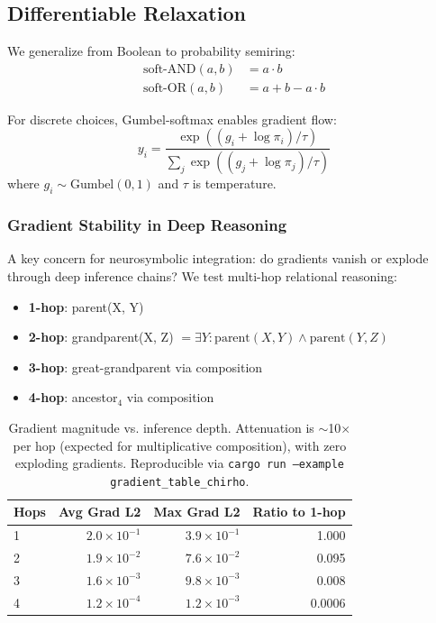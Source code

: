 \documentclass[11pt,a4paper]{article}
\begin{document}
\subsection{Differentiable Relaxation}

We generalize from Boolean to probability semiring:
\begin{align}
  \text{soft-AND}(a, b) &= a \cdot b \\
  \text{soft-OR}(a, b) &= a + b - a \cdot b
\end{align}

For discrete choices, Gumbel-softmax \cite{gumbel_softmax_chirho} enables gradient flow:
\[
y_i = \frac{\exp((g_i + \log \pi_i) / \tau)}{\sum_j \exp((g_j + \log \pi_j) / \tau)}
\]
where $g_i \sim \text{Gumbel}(0, 1)$ and $\tau$ is temperature.

\subsubsection{Gradient Stability in Deep Reasoning}

A key concern for neurosymbolic integration: do gradients vanish or explode through deep inference chains? We test multi-hop relational reasoning:
\begin{itemize}
  \item \textbf{1-hop}: parent(X, Y)
  \item \textbf{2-hop}: grandparent(X, Z) $= \exists Y: \text{parent}(X, Y) \wedge \text{parent}(Y, Z)$
  \item \textbf{3-hop}: great-grandparent via composition
  \item \textbf{4-hop}: ancestor$_4$ via composition
\end{itemize}

\begin{table}[H]
\centering
\begin{tabular}{lrrr}
\toprule
\textbf{Hops} & \textbf{Avg Grad L2} & \textbf{Max Grad L2} & \textbf{Ratio to 1-hop} \\
\midrule
1 & $2.0 \times 10^{-1}$ & $3.9 \times 10^{-1}$ & 1.000 \\
2 & $1.9 \times 10^{-2}$ & $7.6 \times 10^{-2}$ & 0.095 \\
3 & $1.6 \times 10^{-3}$ & $9.8 \times 10^{-3}$ & 0.008 \\
4 & $1.2 \times 10^{-4}$ & $1.2 \times 10^{-3}$ & 0.0006 \\
\bottomrule
\end{tabular}
\caption{Gradient magnitude vs. inference depth. Attenuation is $\sim$10$\times$ per hop (expected for multiplicative composition), with zero exploding gradients. Reproducible via \texttt{cargo run --example gradient\_table\_chirho}.}
\label{tab:gradients}
\end{table}
\end{document}
